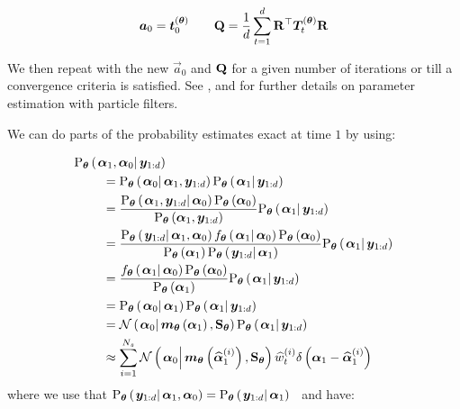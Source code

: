 \begin{equation}
\vec{a}_0 = \vec{t}_0^{(\vec{\theta})} \qquad
%
\mat{Q} = \frac{1}{d}\sum_{t = 1}^d \mat{R}^\top\vec{T}_t^{(\vec{\theta})}\mat{R}
\end{equation}

We then repeat with the new $\vec{a}_0$ and $\mathbf{Q}$ for a given number of iterations or till a convergence criteria is satisfied.  See \cite{kantas15}, \cite{del10} and \cite{schon11} for further details on parameter estimation with particle filters.

We can do parts of the probability estimates exact at time $1$ by using:

\begin{equation}\begin{split}
\optorC{\Prob_{\vec{\theta}}}{\vec{\alpha}_1, \vec{\alpha}_0}{\vec{y}_{1:d}} \hspace{-50pt} & \\
%
& = \optorC{\Prob_{\vec{\theta}}}{\vec{\alpha}_0}{\vec{\alpha}_1, \vec{y}_{1:d}}
	\optorC{\Prob_{\vec{\theta}}}{\vec{\alpha}_1}{\vec{y}_{1:d}} \\
%
& = \frac{
		\optorC{\Prob_{\vec{\theta}}}{\vec{\alpha}_1, \vec{y}_{1:d}}{\vec{\alpha}_0}
		\optor{\Prob_{\vec{\theta}}}{\vec{\alpha}_0}
	}{ %
		\optor{\Prob_{\vec{\theta}}}{\vec{\alpha}_1, \vec{y}_{1:d}}
	} %
	\optorC{\Prob_{\vec{\theta}}}{\vec{\alpha}_1}{\vec{y}_{1:d}} \\
%
& = \frac{
		\optorC{\Prob_{\vec{\theta}}}{\vec{y}_{1:d}}{\vec{\alpha}_1, \vec{\alpha}_0}
		\optorC{f_{\vec{\theta}}}{\vec{\alpha}_1}{\vec{\alpha}_0}
		\optor{\Prob_{\vec{\theta}}}{\vec{\alpha}_0}
	}{ %
		\optor{\Prob_{\vec{\theta}}}{\vec{\alpha}_1}
		\optorC{\Prob_{\vec{\theta}}}{\vec{y}_{1:d}}{\vec{\alpha}_1}
	} %
	\optorC{\Prob_{\vec{\theta}}}{\vec{\alpha}_1}{\vec{y}_{1:d}} \\
%
& = \frac{
		\optorC{f_{\vec{\theta}}}{\vec{\alpha}_1}{\vec{\alpha}_0}
		\optor{\Prob_{\vec{\theta}}}{\vec{\alpha}_0}
	}{ %
		\optor{\Prob_{\vec{\theta}}}{\vec{\alpha}_1}
	} %
	\optorC{\Prob_{\vec{\theta}}}{\vec{\alpha}_1}{\vec{y}_{1:d}} \\
%
& = \optorC{\Prob_{\vec{\theta}}}{\vec{\alpha}_0}{\vec{\alpha}_1}
	\optorC{\Prob_{\vec{\theta}}}{\vec{\alpha}_1}{\vec{y}_{1:d}} \\
%
& = \normalC{\vec{\alpha}_0}{
		\optor{\vec{m}_{\vec{\theta}}}{\vec{\alpha}_1}
	}{ %
		\mat{S}_{\vec{\theta}}
	}
	\optorC{\Prob_{\vec{\theta}}}{\vec{\alpha}_1}{\vec{y}_{1:d}} \\
%
& \approx \sum_{i=1}^{N_s}
	\normalC{\vec{\alpha}_0}{
		\optor{\vec{m}_{\vec{\theta}}}{\particS{\vec{\alpha}}{1}{i}}
	}{ %
		\mat{S}_{\vec{\theta}}
	}
	\particS{w}{t}{i}\dirac{\vec{\alpha}_1 - \particS{\vec{\alpha}}{1}{i}}
\end{split}\end{equation} %
%
% 
where we use that %
$\optorC{\Prob_{\vec{\theta}}}{\vec{y}_{1:d}}{\vec{\alpha}_1, \vec{\alpha}_0} = \optorC{\Prob_{\vec{\theta}}}{\vec{y}_{1:d}}{\vec{\alpha}_1}$%
~and have:

